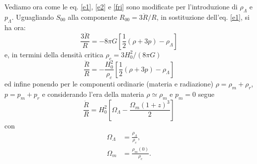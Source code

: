 Vediamo ora come le eq. \eqref{e1}, \eqref{e2} e \eqref{fri} sono modificate per
l'introduzione di $\rho_{\Lambda}$ e $p_{\Lambda}$.  Uguagliando $S_{00}$ alla
componente $R_{00}= 3 \ddot{R}/R$, in sostituzione dell'eq. \eqref{e1}, si ha
ora:
\begin{equation}
  \frac{3 \ddot{R}}{R} = - 8\pi G \left[ \frac{1}{2}  (\rho+3p) - \rho_{\Lambda}
  \right]
  \label{ecc1}
\end{equation}
e, in termini della densità critica $\rho_c=3H_0^2/(8\pi G)$
\begin{equation}
  \frac {\ddot{R}} {R} = - \frac {H_0^2} {\rho_c}
  \left[
    \frac {1}{2}  (\rho+3p) - \rho_{\Lambda}
  \right]
\end{equation}
ed infine ponendo per le componenti ordinarie (materia e radiazione)
$\rho=\rho_m+\rho_r$, $p=p_m+p_r$ e considerando l'era della materia $\rho
\simeq \rho_m$ e $p_m=0$ segue
\begin{equation}
  \label{ddRcc}
  \frac {\ddot{R}} {R} = H_0^2
  \left[ \Omega_{\Lambda} -\frac{\Omega_m (1+z)^3}{2} \right]
\end{equation}
con
\begin{subequations}
  \begin{align}
    \Omega_{\Lambda} &= \frac{\rho_{\Lambda}}{\rho_c}, \\
    \Omega_m       &= \frac{\rho_m(0)}{\rho_c}.
  \end{align}
\end{subequations}

